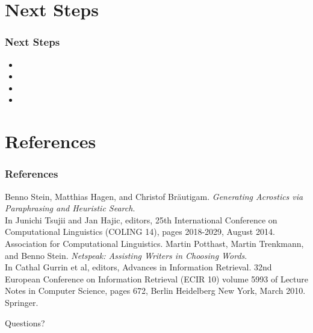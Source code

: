 \documentclass{beamer}
\begin{document}
\section{Next Steps}

\begin{frame}
\frametitle{Next Steps}
\begin{itemize}
\item 
\item 
\item 
\item 
\end{itemize}
\end{frame}

\section{References}

\begin{frame}
\frametitle{References}
\footnotesize
\begin{thebibliography}{1}
	Benno Stein, Matthias Hagen, and Christof Bräutigam. \emph{Generating Acrostics via Paraphrasing and Heuristic Search}. \\
	In Junichi Tsujii and Jan Hajic, editors, 25th International Conference on Computational Linguistics (COLING 14), pages 2018-2029, August 2014. Association for Computational Linguistics. 
	Martin Potthast, Martin Trenkmann, and Benno Stein.
	\emph{Netspeak: Assisting Writers in Choosing Words}. \\
	In Cathal Gurrin et al, editors, Advances in Information Retrieval. 32nd European Conference on Information Retrieval (ECIR 10) volume 5993 of Lecture Notes in Computer Science, pages 672, Berlin Heidelberg New York, March 2010. Springer.
\end{thebibliography}
\end{frame}

\begin{frame}
\Huge{\centerline{Questions?}}
\end{frame}

\end{document}
